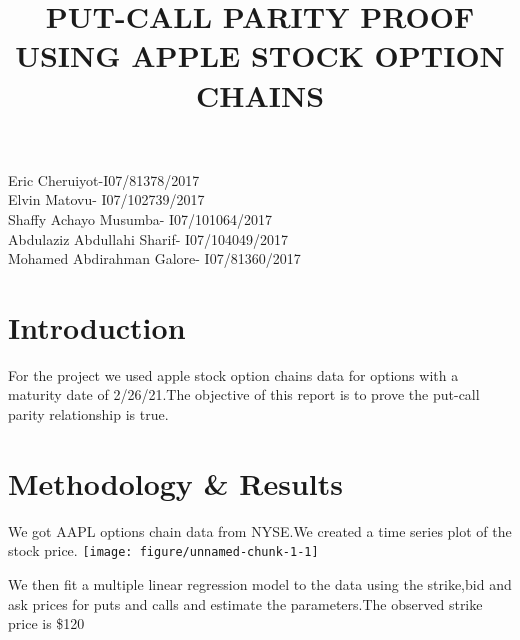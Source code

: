 \documentclass[12pt, a4paper]{report}\usepackage[]{graphicx}\usepackage[]{color}
\makeatletter
\def\maxwidth{ %
  \ifdim\Gin@nat@width>\linewidth
    \linewidth
  \else
    \Gin@nat@width
  \fi
}
\newenvironment{knitrout}{}{} %
\makeatother
\begin{document}
\title{PUT-CALL PARITY PROOF USING APPLE STOCK OPTION CHAINS}

Eric Cheruiyot-I07/81378/2017\\
 
Elvin Matovu- I07/102739/2017\\

Shaffy Achayo Musumba- I07/101064/2017\\

Abdulaziz Abdullahi Sharif- I07/104049/2017\\

Mohamed Abdirahman Galore- I07/81360/2017\\
\vspace{5cm}
\maketitle
\newpage
\section{Introduction}
\setcounter{page}{1}
For the project we used apple stock option chains data for options with a maturity date of 2/26/21.The objective of this report is to prove the put-call parity relationship is true.
\section{Methodology \& Results}
We got AAPL  options chain data from NYSE.We created a time series plot of the stock price.
\begin{knitrout}
\color{fgcolor}
\texttt{[image: figure/unnamed-chunk-1-1]} 

\end{knitrout}

We then fit a multiple linear regression model to the data using the strike,bid and ask prices for puts and calls and estimate the parameters.The observed strike price is \$120
\end{document}
